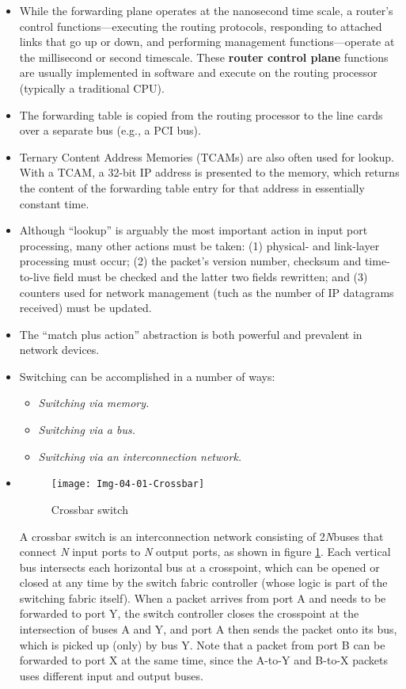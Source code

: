 \begin{itemize}
\item
While the forwarding plane operates at the nanosecond time scale, a router's control functions---executing the routing protocols, responding to attached links that go up or down, and performing management functions---operate at the millisecond or second timescale. These \textbf{router control plane} functions are usually implemented in software and execute on the routing processor (typically a traditional CPU).

\item
The forwarding table is copied from the routing processor to the line cards over a separate bus (e.g., a PCI bus).

\item
Ternary Content Address Memories (TCAMs) are also often used for lookup. With a TCAM, a 32-bit IP address is presented to the memory, which returns the content of the forwarding table entry for that address in essentially constant time.

\item
Although ``lookup'' is arguably the most important action in input port processing, many other actions must be taken: (1) physical- and link-layer processing must occur; (2) the packet's version number, checksum and time-to-live field must be checked and the latter two fields rewritten; and (3) counters used for network management (tuch as the number of IP datagrams received) must be updated.

\item
The ``match plus action'' abstraction is both powerful and prevalent in network devices.

\item
Switching can be accomplished in a number of ways:
\begin{itemize}
\item\textit{Switching via memory.}
\item\textit{Switching via a bus.}
\item\textit{Switching via an interconnection network.}
\end{itemize}

\item
\begin{figure}[h]
\texttt{[image: Img-04-01-Crossbar]}
\centering
\caption{Crossbar switch}
\label{fig:fig-04-01}
\end{figure}
A crossbar switch is an interconnection network consisting of 2\textit{N}buses that connect \textit{N} input ports to \textit{N} output ports, as shown in figure \ref{fig:fig-04-01}. Each vertical bus intersects each horizontal bus at a crosspoint, which can be opened or closed at any time by the switch fabric controller (whose logic is part of the switching fabric itself). When a packet arrives from port A and needs to be forwarded to port Y, the switch controller closes the crosspoint at the intersection of buses A and Y, and port A then sends the packet onto its bus, which is picked up (only) by bus Y. Note that a packet from port B can be forwarded to port X at the same time, since the A-to-Y and B-to-X packets uses different input and output buses.


\end{itemize}

